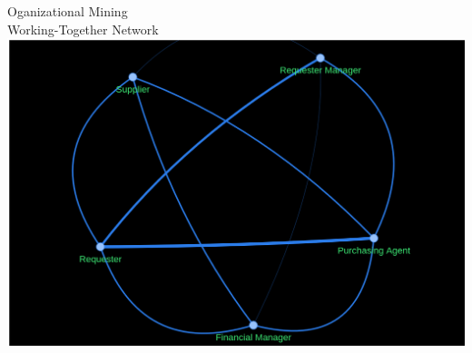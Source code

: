 \documentclass[ignorenonframetext,xcolor=x11names]{beamer}
\begin{document}
\begin{frame}{Oganizational Mining \\ \small Working-Together Network}
\centering
\includegraphics[width=.9\textwidth]{screen4.png}
\end{frame}
\end{document}
